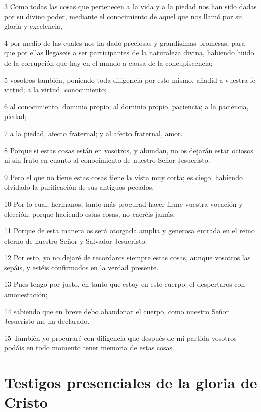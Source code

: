 \par 3 Como todas las cosas que pertenecen a la vida y a la piedad nos han sido dadas por su divino poder, mediante el conocimiento de aquel que nos llamó por su gloria y excelencia,
\par 4 por medio de las cuales nos ha dado preciosas y grandísimas promesas, para que por ellas llegaseis a ser participantes de la naturaleza divina, habiendo huido de la corrupción que hay en el mundo a causa de la concupiscencia;
\par 5 vosotros también, poniendo toda diligencia por esto mismo, añadid a vuestra fe virtud; a la virtud, conocimiento;
\par 6 al conocimiento, dominio propio; al dominio propio, paciencia; a la paciencia, piedad;
\par 7 a la piedad, afecto fraternal; y al afecto fraternal, amor.
\par 8 Porque si estas cosas están en vosotros, y abundan, no os dejarán estar ociosos ni sin fruto en cuanto al conocimiento de nuestro Señor Jesucristo.
\par 9 Pero el que no tiene estas cosas tiene la vista muy corta; es ciego, habiendo olvidado la purificación de sus antiguos pecados.
\par 10 Por lo cual, hermanos, tanto más procurad hacer firme vuestra vocación y elección; porque haciendo estas cosas, no caeréis jamás.
\par 11 Porque de esta manera os será otorgada amplia y generosa entrada en el reino eterno de nuestro Señor y Salvador Jesucristo.
\par 12 Por esto, yo no dejaré de recordaros siempre estas cosas, aunque vosotros las sepáis, y estéis confirmados en la verdad presente.
\par 13 Pues tengo por justo, en tanto que estoy en este cuerpo, el despertaros con amonestación;
\par 14 sabiendo que en breve debo abandonar el cuerpo, como nuestro Señor Jesucristo me ha declarado.
\par 15 También yo procuraré con diligencia que después de mi partida vosotros podáis en todo momento tener memoria de estas cosas.

\section*{Testigos presenciales de la gloria de Cristo}

